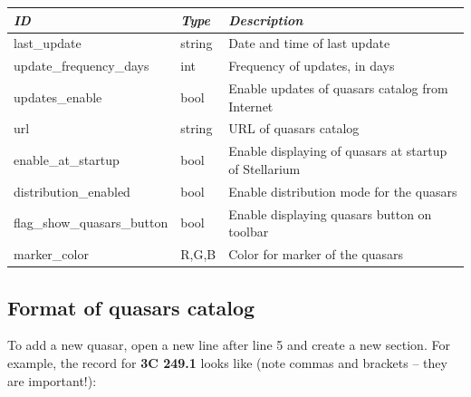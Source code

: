 \begin{tabularx}{\textwidth}{l|l|X}\toprule
\emph{ID}               & \emph{Type} & \emph{Description}\\\midrule
last\_update                & string & Date and time of last update\\%
update\_frequency\_days     & int    & Frequency of updates, in days\\%
updates\_enable             & bool   & Enable updates of quasars catalog from Internet \\%
url                         & string & URL of quasars catalog \\%
enable\_at\_startup         & bool   & Enable displaying of quasars at startup of Stellarium \\%
distribution\_enabled       & bool   & Enable distribution mode for the quasars \\%
flag\_show\_quasars\_button & bool   & Enable displaying quasars button on toolbar \\%
marker\_color               & R,G,B  & Color for marker of the quasars \\\bottomrule
\end{tabularx}

\subsection{Format of quasars catalog}
\label{sec:plugins:Quasars:format}


%

To add a new quasar, open a new line after line 5 and create a new section. 
For example, the record for \textbf{3C 249.1} looks like (note commas and brackets -- 
they are important!):


